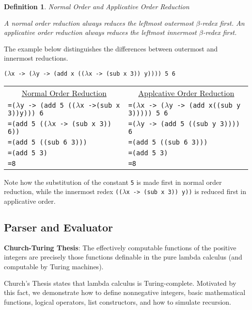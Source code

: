 \documentclass[11pt]{article}
\newtheorem{definition}{Definition}
\begin{document}
\begin{definition}{Normal Order and Applicative Order Reduction}

A normal order reduction always reduces the leftmost outermost $\beta$-redex first. An applicative order reduction always reduces the leftmost innermost $\beta$-redex first.

\end{definition}

The example  below distinguishes the differences between outermost and innermost reductions.

\begin{center}
\texttt{($\lambda$x -> ($\lambda$y -> (add x (($\lambda$x -> (sub x 3)) y)))) 5 6}
\end{center}

\begin{tabular}{l | l}
\multicolumn{1}{c}{ \underline{Normal Order Reduction}} & \multicolumn{1}{c}{ \underline{Applcative Order Reduction}}\\
\texttt{=($\lambda$y -> (add 5 (($\lambda$x ->(sub x 3))y))) 6}&\texttt{=($\lambda$x -> ($\lambda$y -> (add x((sub y 3))))) 5 6}\\
\texttt{=(add 5 (($\lambda$x -> (sub x 3)) 6))}&\texttt{=($\lambda$y -> (add 5 ((sub y 3)))) 6}\\
\texttt{=(add 5 ((sub 6 3)))}&\texttt{=(add 5 ((sub 6 3)))}\\
\texttt{=(add 5 3)}&\texttt{=(add 5 3)}\\
\texttt{=8}&\texttt{=8}\\
\end{tabular}

Note how the substitution of the constant \texttt{5} is made first in normal order reduction, while the innermost redex \texttt{(($\lambda$x -> (sub x 3)) y))} is reduced first in applicative order.

\subsection{Parser and Evaluator}

\textbf{Church-Turing Thesis}: The effectively computable functions of the positive integers are precisely those functions definable in the pure lambda calculus (and computable by Turing machines).

Church's Thesis states that lambda calculus is Turing-complete. Motivated by this fact, we demonstrate how to define nonnegative integers, basic mathematical functions, logical operators, list constructors, and how to simulate recursion.
\end{document}
